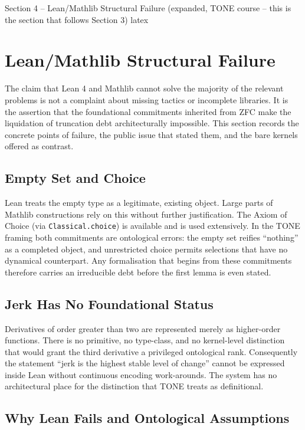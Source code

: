 \documentclass[11pt,a4paper]{article}
\begin{document}
Section 4 – Lean/Mathlib Structural Failure
(expanded, TONE course – this is the section that follows Section 3)
latex

\section{Lean/Mathlib Structural Failure}

The claim that Lean 4 and Mathlib cannot solve the majority of the relevant problems is not a complaint about missing tactics or incomplete libraries. It is the assertion that the foundational commitments inherited from ZFC make the liquidation of truncation debt architecturally impossible. This section records the concrete points of failure, the public issue that stated them, and the bare kernels offered as contrast.

\subsection{Empty Set and Choice}

Lean treats the empty type as a legitimate, existing object. Large parts of Mathlib constructions rely on this without further justification. The Axiom of Choice (via \texttt{Classical.choice}) is available and is used extensively. In the TONE framing both commitments are ontological errors: the empty set reifies “nothing” as a completed object, and unrestricted choice permits selections that have no dynamical counterpart. Any formalisation that begins from these commitments therefore carries an irreducible debt before the first lemma is even stated.

\subsection{Jerk Has No Foundational Status}

Derivatives of order greater than two are represented merely as higher-order functions. There is no primitive, no type-class, and no kernel-level distinction that would grant the third derivative a privileged ontological rank. Consequently the statement “jerk is the highest stable level of change” cannot be expressed inside Lean without continuous encoding work-arounds. The system has no architectural place for the distinction that TONE treats as definitional.

\subsection{Why Lean Fails and Ontological Assumptions}
\end{document}

